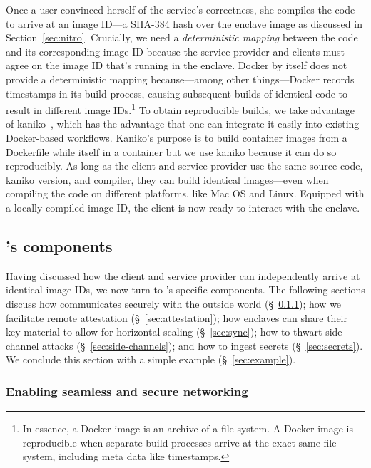 Once a user convinced herself of the service's correctness, she compiles the
code to arrive at an image ID---a SHA-384 hash over the enclave image as
discussed in Section~\ref{sec:nitro}.  Crucially, we need a \emph{deterministic
mapping} between the code and its corresponding image ID because the service
provider and clients must agree on the image ID that's running in the enclave.
Docker by itself does not provide a deterministic mapping because---among other
things---Docker records timestamps in its build process, causing subsequent
builds of identical code to result in different image IDs.\footnote{In essence,
a Docker image is an archive of a file system.  A Docker image is reproducible
when separate build processes arrive at the exact same file system, including
meta data like timestamps.}  To obtain reproducible builds, we take advantage of
kaniko~\cite{kaniko}, which has the advantage that one can integrate it easily
into existing Docker-based workflows.  Kaniko's purpose is to build container
images from a Dockerfile while itself in a container but we use kaniko because
it can do so reproducibly.  As long as the client and service provider use the
same source code, kaniko version, and compiler, they can build identical
images---even when compiling the code on different platforms, like Mac OS and
Linux.  Equipped with a locally-compiled image ID, the client is now ready to
interact with the enclave.

\subsection{\Tool{}'s components}
\label{sec:framework}

Having discussed how the client and service provider can independently arrive at
identical image IDs, we now turn to \tool{}'s specific components.  The
following sections discuss how \tool{}
communicates securely with the outside world (\S~\ref{sec:networking});
how we facilitate remote attestation (\S~\ref{sec:attestation});
how enclaves can share their key material to allow for horizontal scaling (\S~\ref{sec:sync});
how to thwart side-channel attacks (\S~\ref{sec:side-channels}); and
how to ingest secrets (\S~\ref{sec:secrets}).
We conclude this section with a simple example (\S~\ref{sec:example}).

\subsubsection{Enabling seamless and secure networking}
\label{sec:networking}

